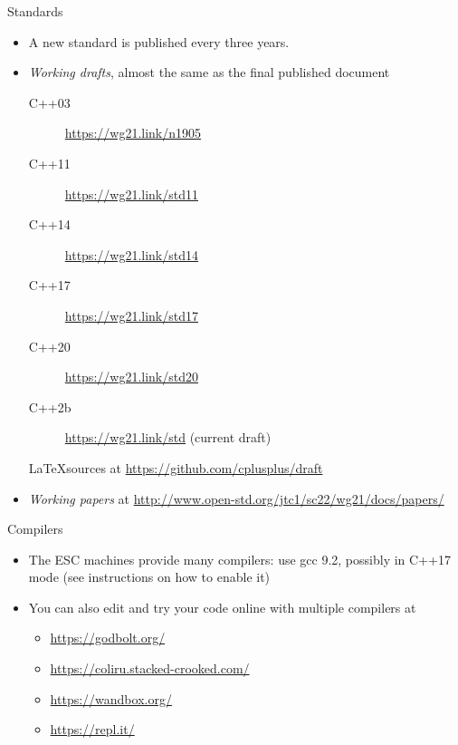 \begin{frame}{Standards}

  \begin{itemize}

  \item A new standard is published every three years.

  \item \textit{Working drafts}, almost the same as the final published document
    \begin{description}
    \item [C++03] \url{https://wg21.link/n1905}
    \item [C++11] \url{https://wg21.link/std11}
    \item [C++14] \url{https://wg21.link/std14}
    \item [C++17] \url{https://wg21.link/std17}
    \item [C++20] \url{https://wg21.link/std20}
    \item [C++2b] \url{https://wg21.link/std} (current draft)
    \end{description}

    \LaTeX sources at \url{https://github.com/cplusplus/draft}

  \item \textit{Working papers} at {\footnotesize
    \url{http://www.open-std.org/jtc1/sc22/wg21/docs/papers/}}

  \end{itemize}

\end{frame}

\begin{frame}{Compilers}
  \begin{itemize}
  \item The ESC machines provide many compilers: use gcc 9.2, possibly in C++17 mode (see instructions on how to enable
  it)
  \item You can also edit and try your code online with multiple compilers at
    \begin{itemize}
    \item \url{https://godbolt.org/}
    \item \url{https://coliru.stacked-crooked.com/}
    \item \url{https://wandbox.org/}
    \item \url{https://repl.it/}
    \end{itemize}
  \end{itemize}
\end{frame}
